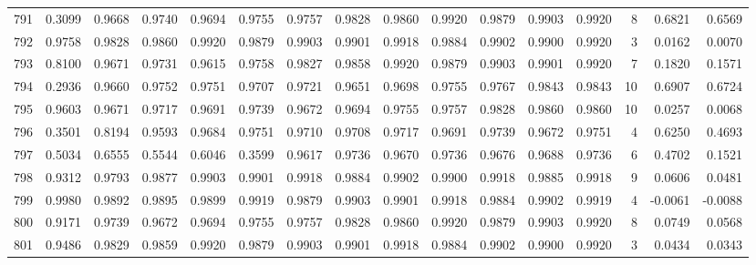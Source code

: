 \begin{tabular}{lrrrrrrrrrrrrrrr}
791 &      0.3099 &  0.9668 &  0.9740 &  0.9694 &  0.9755 &  0.9757 &  0.9828 &  0.9860 &  0.9920 &  0.9879 &   0.9903 &     0.9920 &      8 &                    0.6821 &                     0.6569 \\
792 &      0.9758 &  0.9828 &  0.9860 &  0.9920 &  0.9879 &  0.9903 &  0.9901 &  0.9918 &  0.9884 &  0.9902 &   0.9900 &     0.9920 &      3 &                    0.0162 &                     0.0070 \\
793 &      0.8100 &  0.9671 &  0.9731 &  0.9615 &  0.9758 &  0.9827 &  0.9858 &  0.9920 &  0.9879 &  0.9903 &   0.9901 &     0.9920 &      7 &                    0.1820 &                     0.1571 \\
794 &      0.2936 &  0.9660 &  0.9752 &  0.9751 &  0.9707 &  0.9721 &  0.9651 &  0.9698 &  0.9755 &  0.9767 &   0.9843 &     0.9843 &     10 &                    0.6907 &                     0.6724 \\
795 &      0.9603 &  0.9671 &  0.9717 &  0.9691 &  0.9739 &  0.9672 &  0.9694 &  0.9755 &  0.9757 &  0.9828 &   0.9860 &     0.9860 &     10 &                    0.0257 &                     0.0068 \\
796 &      0.3501 &  0.8194 &  0.9593 &  0.9684 &  0.9751 &  0.9710 &  0.9708 &  0.9717 &  0.9691 &  0.9739 &   0.9672 &     0.9751 &      4 &                    0.6250 &                     0.4693 \\
797 &      0.5034 &  0.6555 &  0.5544 &  0.6046 &  0.3599 &  0.9617 &  0.9736 &  0.9670 &  0.9736 &  0.9676 &   0.9688 &     0.9736 &      6 &                    0.4702 &                     0.1521 \\
798 &      0.9312 &  0.9793 &  0.9877 &  0.9903 &  0.9901 &  0.9918 &  0.9884 &  0.9902 &  0.9900 &  0.9918 &   0.9885 &     0.9918 &      9 &                    0.0606 &                     0.0481 \\
799 &      0.9980 &  0.9892 &  0.9895 &  0.9899 &  0.9919 &  0.9879 &  0.9903 &  0.9901 &  0.9918 &  0.9884 &   0.9902 &     0.9919 &      4 &                   -0.0061 &                    -0.0088 \\
800 &      0.9171 &  0.9739 &  0.9672 &  0.9694 &  0.9755 &  0.9757 &  0.9828 &  0.9860 &  0.9920 &  0.9879 &   0.9903 &     0.9920 &      8 &                    0.0749 &                     0.0568 \\
801 &      0.9486 &  0.9829 &  0.9859 &  0.9920 &  0.9879 &  0.9903 &  0.9901 &  0.9918 &  0.9884 &  0.9902 &   0.9900 &     0.9920 &      3 &                    0.0434 &                     0.0343 \\

\end{tabular}
